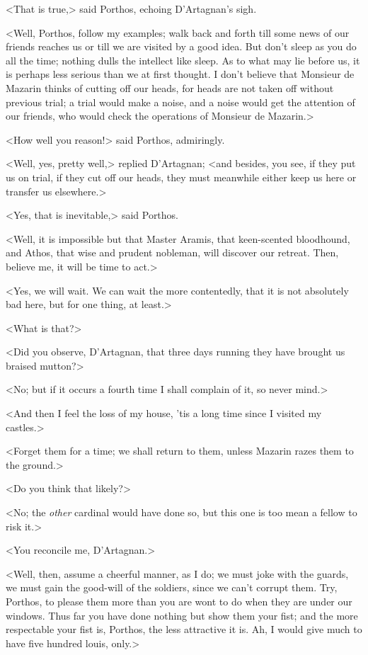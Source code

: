 <That is true,> said Porthos, echoing D'Artagnan's sigh.

<Well, Porthos, follow my examples; walk back and forth till some news of our friends reaches us or till we are visited by a good idea. But don't sleep as you do all the time; nothing dulls the intellect like sleep. As to what may lie before us, it is perhaps less serious than we at first thought. I don't believe that Monsieur de Mazarin thinks of cutting off our heads, for heads are not taken off without previous trial; a trial would make a noise, and a noise would get the attention of our friends, who would check the operations of Monsieur de Mazarin.>

<How well you reason!> said Porthos, admiringly.

<Well, yes, pretty well,> replied D'Artagnan; <and besides, you see, if they put us on trial, if they cut off our heads, they must meanwhile either keep us here or transfer us elsewhere.>

<Yes, that is inevitable,> said Porthos.

<Well, it is impossible but that Master Aramis, that keen-scented bloodhound, and Athos, that wise and prudent nobleman, will discover our retreat. Then, believe me, it will be time to act.>

<Yes, we will wait. We can wait the more contentedly, that it is not absolutely bad here, but for one thing, at least.>

<What is that?>

<Did you observe, D'Artagnan, that three days running they have brought us braised mutton?>

<No; but if it occurs a fourth time I shall complain of it, so never mind.>

<And then I feel the loss of my house, 'tis a long time since I visited my castles.>

<Forget them for a time; we shall return to them, unless Mazarin razes them to the ground.>

<Do you think that likely?>

<No; the \textit{other} cardinal would have done so, but this one is too mean a fellow to risk it.>

<You reconcile me, D'Artagnan.>

<Well, then, assume a cheerful manner, as I do; we must joke with the guards, we must gain the good-will of the soldiers, since we can't corrupt them. Try, Porthos, to please them more than you are wont to do when they are under our windows. Thus far you have done nothing but show them your fist; and the more respectable your fist is, Porthos, the less attractive it is. Ah, I would give much to have five hundred louis, only.>

